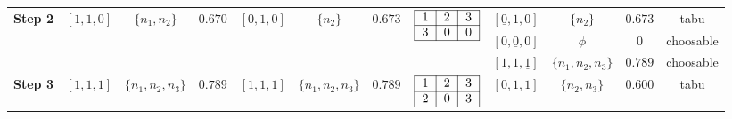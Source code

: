 \begin{table}[hbt]
{\begin{tabular}{|c|c|c|c|c|c|c|c|c|c|c|c|}
    \multicolumn{1}{|c|}{\multirow{3}{*}{\textbf{Step 2}}}
    &\multicolumn{1}{c|}{\multirow{3}{*}{$[1,1,0]$}}
    &\multicolumn{1}{c|}{\multirow{3}{*}{$\{n_1,n_2\}$}}
    &\multicolumn{1}{c|}{\multirow{3}{*}{$0.670$}}
    &\multicolumn{1}{c|}{\multirow{3}{*}{$[0,1,0]$}}
    &\multicolumn{1}{c|}{\multirow{3}{*}{$\{n_2\}$}}
    &\multicolumn{1}{c|}{\multirow{3}{*}{$0.673$}}
    &\multicolumn{1}{c|}{\multirow{3}{*}{$
                                                     \begin{tabular}{|c|c|c|}
                                                        \hline
                                                        1 & 2 & 3 \\
                                                        \hline
                                                        3 & 0 & 0 \\
                                                        \hline
                                                     \end{tabular}$}}
    &$[\underline{0},1,0]$ &$\{n_2\}$ & $0.673$ & tabu
    \\
    
    \multicolumn{1}{|c|}{}
    &\multicolumn{1}{c|}{}
    &\multicolumn{1}{c|}{}
    &\multicolumn{1}{c|}{}
    &\multicolumn{1}{c|}{}
    &\multicolumn{1}{c|}{}
    &\multicolumn{1}{c|}{}
    &\multicolumn{1}{c|}{}
    &$[0,\underline{0},0]$ & $\phi$ & $0$ & choosable
    \\
    
    \multicolumn{1}{|c|}{}
    &\multicolumn{1}{c|}{}
    &\multicolumn{1}{c|}{}
    &\multicolumn{1}{c|}{}
    &\multicolumn{1}{c|}{}
    &\multicolumn{1}{c|}{}
    &\multicolumn{1}{c|}{}
    &\multicolumn{1}{c|}{}
    &$[1,1,\underline{1}]$ & $\{n_1,n_2,n_3\}$ & $0.789$ & choosable
    \\

    \hline
    \multicolumn{1}{|c|}{\multirow{3}{*}{\textbf{Step 3}}}
    &\multicolumn{1}{c|}{\multirow{3}{*}{$[1,1,1]$}}
    &\multicolumn{1}{c|}{\multirow{3}{*}{$\{n_1,n_2,n_3\}$}}
    &\multicolumn{1}{c|}{\multirow{3}{*}{$0.789$}}
    &\multicolumn{1}{c|}{\multirow{3}{*}{$[1,1,1]$}}
    &\multicolumn{1}{c|}{\multirow{3}{*}{$\{n_1,n_2,n_3\}$}}
    &\multicolumn{1}{c|}{\multirow{3}{*}{$0.789$}}
    &\multicolumn{1}{c|}{\multirow{3}{*}{$
                                                     \begin{tabular}{|c|c|c|}
                                                        \hline
                                                        1 & 2 & 3 \\
                                                        \hline
                                                        2 & 0 & 3 \\
                                                        \hline
                                                     \end{tabular}$}}
    &$[\underline{0},1,1]$ &$\{n_2,n_3\}$ & $0.600$ & tabu
    \\
    

\end{tabular}}
\end{table}
